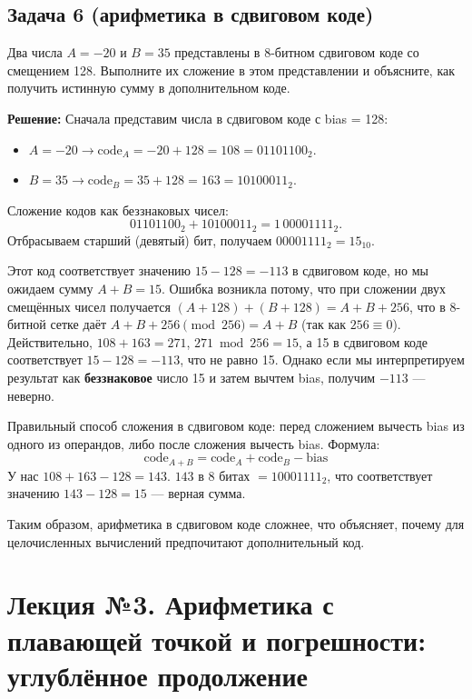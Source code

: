 \subsection*{Задача 6 (арифметика в сдвиговом коде)}
Два числа $A=-20$ и $B=35$ представлены в 8-битном сдвиговом коде со смещением 128. Выполните их сложение в этом представлении и объясните, как получить истинную сумму в дополнительном коде.

\textbf{Решение:}
Сначала представим числа в сдвиговом коде с bias = 128:
\begin{itemize}
    \item $A=-20 \to \text{code}_A = -20 + 128 = 108 = 01101100_2$.
    \item $B=35 \to \text{code}_B = 35 + 128 = 163 = 10100011_2$.
\end{itemize}

Сложение кодов как беззнаковых чисел:
\[01101100_2 + 10100011_2 = 1\,00001111_2.\]
Отбрасываем старший (девятый) бит, получаем $00001111_2 = 15_{10}$.

Этот код соответствует значению $15 - 128 = -113$ в сдвиговом коде, но мы ожидаем сумму $A+B = 15$. Ошибка возникла потому, что при сложении двух смещённых чисел получается $(A+128)+(B+128) = A+B+256$, что в 8-битной сетке даёт $A+B+256 \pmod{256} = A+B$ (так как $256 \equiv 0$). Действительно, $108+163 = 271$, $271 \bmod 256 = 15$, а 15 в сдвиговом коде соответствует $15 - 128 = -113$, что не равно 15. Однако если мы интерпретируем результат как \textbf{беззнаковое} число 15 и затем вычтем bias, получим $-113$ — неверно.

Правильный способ сложения в сдвиговом коде: перед сложением вычесть bias из одного из операндов, либо после сложения вычесть bias. Формула:
\[
\text{code}_{A+B} = \text{code}_A + \text{code}_B - \text{bias}
\]
У нас $108 + 163 - 128 = 143$. $143$ в 8 битах $= 10001111_2$, что соответствует значению $143-128=15$ — верная сумма.

Таким образом, арифметика в сдвиговом коде сложнее, что объясняет, почему для целочисленных вычислений предпочитают дополнительный код.


\newpage
\section{Лекция №3. Арифметика с плавающей точкой и погрешности: углублённое продолжение}






